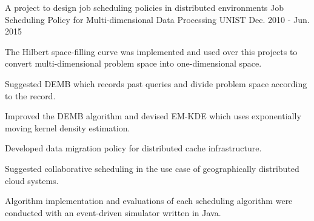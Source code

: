 \begin{cventries}
\cventry
{A project to design job scheduling policies in distributed environments} %
{Job Scheduling Policy for Multi-dimensional Data Processing} %
{UNIST} %
{Dec. 2010 - Jun. 2015} %
{ %
\begin{cvitems}
\item {The Hilbert space-filling curve was implemented and used over this projects
to convert multi-dimensional problem space into \newline one-dimensional space.}
\item {Suggested DEMB which records past queries and divide problem space according to the record.}
\item {Improved the DEMB algorithm and devised EM-KDE which uses exponentially moving kernel density
estimation.}
\item {Developed data migration policy for distributed cache infrastructure.}
\item {Suggested collaborative scheduling in the use case of geographically distributed
cloud systems.}
\item {Algorithm implementation and evaluations of each scheduling algorithm were conducted
with an event-driven simulator written \newline in Java.}
\end{cvitems}
}


\end{cventries}
